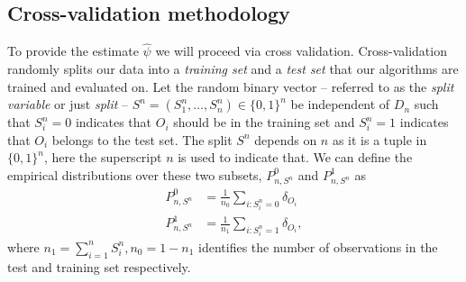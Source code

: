 \documentclass[11pt, a4paper]{article}
\theoremstyle{definition}
\theoremstyle{remark}
\newcommand{\la}{\psi}
\newcommand{\Sn}{S^n}
\begin{document}
\subsection{Cross-validation methodology}
To provide the estimate $ \hat{\la} $ we will proceed via cross validation. Cross-validation randomly splits our data into a \textit{training set} and a \textit{test set} that our algorithms are trained and evaluated on. Let the random binary vector -- referred to as the \textit{split variable} or just \textit{split} -- $ \Sn = (\Sn_1,\ldots,\Sn_n) \in \{0,1\}^{n} $ be independent of $ D_n $ such that $ \Sn_i = 0 $ indicates that $ O_i $ should be in the training set and $ \Sn_i = 1 $ indicates that $ O_i $ belongs to the test set. The split $ \Sn $ depends on $ n $ as it is a tuple in $ \{0,1\}^{n} $, here the superscript $ n $ is used to indicate that. We can define the empirical distributions over these two subsets, $ P_{n,\Sn}^0$ and $ P_{n,\Sn}^{1} $ as
\begin{align*}
    P_{n,\Sn}^{0} &= \frac{1}{n_0} \sum_{i: \Sn_i = 0} \delta_{O_i} \\
    P_{n,\Sn}^{1} &= \frac{1}{n_1} \sum_{i: \Sn_i = 1} \delta_{O_i},
\end{align*}
where $ n_1 = \sum_{i = 1}^{n} \Sn_i, n_0 = 1-n_1$ identifies the number of observations in the test and training set respectively.
\end{document}
